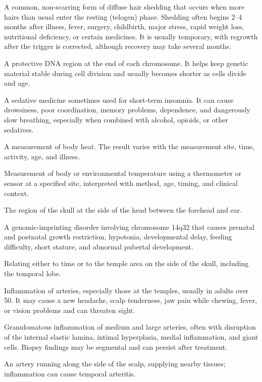  A common, non-scarring form of diffuse hair shedding that occurs when more hairs than usual enter the resting (telogen) phase. Shedding often begins 2--4 months after illness, fever, surgery, childbirth, major stress, rapid weight loss, nutritional deficiency, or certain medicines. It is usually temporary, with regrowth after the trigger is corrected, although recovery may take several months.

 A protective DNA region at the end of each chromosome. It helps keep genetic material stable during cell division and usually becomes shorter as cells divide and age.

 A sedative medicine sometimes used for short-term insomnia. It can cause drowsiness, poor coordination, memory problems, dependence, and dangerously slow breathing, especially when combined with alcohol, opioids, or other sedatives.

 A measurement of body heat. The result varies with the measurement site, time, activity, age, and illness.

 Measurement of body or environmental temperature using a thermometer or sensor at a specified site, interpreted with method, age, timing, and clinical context.

 The region of the skull at the side of the head between the forehead and ear.

 A genomic-imprinting disorder involving chromosome 14q32 that causes prenatal and
postnatal growth restriction, hypotonia, developmental delay, feeding difficulty, short
stature, and abnormal pubertal development.

 Relating either to time or to the temple area on the side of the skull, including the temporal lobe.

 Inflammation of arteries, especially those at the temples, usually in adults over 50. It may cause a new headache, scalp tenderness, jaw pain while chewing, fever, or vision problems and can threaten sight.

 Granulomatous inflammation of medium and large arteries, often with disruption of the internal elastic lamina, intimal hyperplasia, medial inflammation, and giant cells. Biopsy findings may be segmental and can persist after treatment.

 An artery running along the side of the scalp, supplying nearby tissues; inflammation can cause temporal arteritis.

